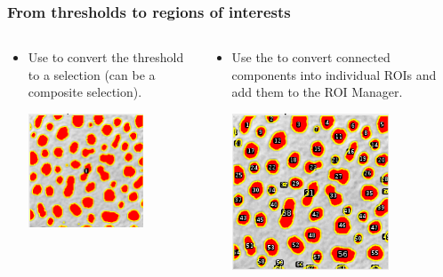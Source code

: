 \documentclass[ignorenonframetext,aspectratio=169,10pt,xcolor=table]{beamer}
\begin{document}
\begin{frame} \frametitle{From thresholds to regions of interests}
    \begin{columns}
      \begin{column}{0.5\textwidth}
    \begin{itemize}
    \item Use  to convert the
      threshold to a selection (can be a composite selection).
      \begin{center}
      \includegraphics[width=0.7\textwidth]{threshold2selection}
      \end{center}
    \end{itemize}
  \end{column}
  \begin{column}{0.5\textwidth}
    \begin{itemize}
      \item Use the  to convert
      connected components into individual ROIs and add them to the ROI
      Manager.
      \begin{center}
        \includegraphics[width=0.7\textwidth]{thresholdroimanager}
      \end{center}
    \end{itemize}
  \end{column}
  \end{columns}
\end{frame}
\end{document}
